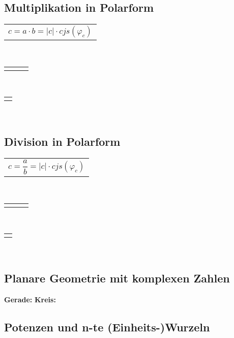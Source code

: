 \begin{minipage}[t]{0.5\textwidth}
	\subsection{Multiplikation in Polarform}
		\begin{tabular}{l}
			$c = a \cdot b = \left| c \right| \cdot cjs(\varphi_{c})$
		\end{tabular}\\[3pt]
		\begin{tabular}{lcl}
			\fbox{$\left| c \right| = \left| a \right| \cdot \left|b\right| = \left| a \cdot b \right|$} & \fbox{$\varphi_{c} = \varphi_{a} + \varphi_{b}$}
		\end{tabular}\\[3pt]
		\begin{tabular}{l}
			\fbox{$arg(c) = arg(a \cdot b) = arg(a) + arg(b)$}
		\end{tabular}\\[3pt]
\end{minipage}
\begin{minipage}[t]{0.5\textwidth}
	\subsection{Division in Polarform}
		\begin{tabular}{l}
			$c = \dfrac{a}{b} = \left| c \right| \cdot cjs(\varphi_{c})$
		\end{tabular}\\[3pt]
		\begin{tabular}{lcl}
			\fbox{$\left| c \right| = \dfrac{\left| a \right|}{\left|b\right|} = \left| \dfrac{a}{b} \right|$} & \fbox{$\varphi_{c} = \varphi_{a} - \varphi_{b}$}
		\end{tabular}\\[3pt]
		\begin{tabular}{l}
			\fbox{$arg(c) = arg\left(\dfrac{a}{b}\right) = arg(a) - arg(b)$}
		\end{tabular}\\[3pt]
\end{minipage}

\subsection{Planare Geometrie mit komplexen Zahlen}
	\textbf{Gerade:}
	\textbf{Kreis:}

\subsection{Potenzen und n-te (Einheits-)Wurzeln}

